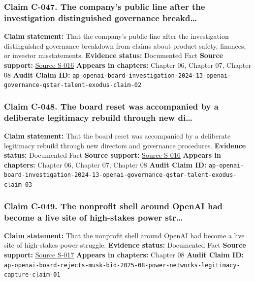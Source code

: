 \documentclass[
  american,
  11pt,
  letterpaper,
]{article}
\begin{document}
\subsubsection{Claim C-047. The company's public line after the
investigation distinguished governance
breakd\ldots{}}\label{claim-c-047-the-company-s-public-line-after-the-investigation-distinguished-governance-breakd}

\textbf{Claim statement:} That the company's public line after the
investigation distinguished governance breakdown from claims about
product safety, finances, or investor misstatements. \textbf{Evidence
status:} Documented Fact \textbf{Source support:}
\hyperref[source-s-016-openai-has-full-confidence-in-ceo-sam-altman-after-investigation-reinstates-him-to-board]{Source
S-016} \textbf{Appears in chapters:} Chapter 06, Chapter 07, Chapter 08
\textbf{Audit Claim ID:}
\texttt{ap-openai-board-investigation-2024-13-openai-governance-qstar-talent-exodus-claim-02}

\subsubsection{Claim C-048. The board reset was accompanied by a
deliberate legitimacy rebuild through new
di\ldots{}}\label{claim-c-048-the-board-reset-was-accompanied-by-a-deliberate-legitimacy-rebuild-through-new-di}

\textbf{Claim statement:} That the board reset was accompanied by a
deliberate legitimacy rebuild through new directors and governance
procedures. \textbf{Evidence status:} Documented Fact \textbf{Source
support:}
\hyperref[source-s-016-openai-has-full-confidence-in-ceo-sam-altman-after-investigation-reinstates-him-to-board]{Source
S-016} \textbf{Appears in chapters:} Chapter 06, Chapter 07, Chapter 08
\textbf{Audit Claim ID:}
\texttt{ap-openai-board-investigation-2024-13-openai-governance-qstar-talent-exodus-claim-03}

\subsubsection{Claim C-049. The nonprofit shell around OpenAI had become
a live site of high-stakes power
str\ldots{}}\label{claim-c-049-the-nonprofit-shell-around-openai-had-become-a-live-site-of-high-stakes-power-str}

\textbf{Claim statement:} That the nonprofit shell around OpenAI had
become a live site of high-stakes power struggle. \textbf{Evidence
status:} Documented Fact \textbf{Source support:}
\hyperref[source-s-017-openai-board-unanimously-rejects-elon-musk-s-97-4-billion-proposal]{Source
S-017} \textbf{Appears in chapters:} Chapter 08 \textbf{Audit Claim ID:}
\texttt{ap-openai-board-rejects-musk-bid-2025-08-power-networks-legitimacy-capture-claim-01}
\end{document}
